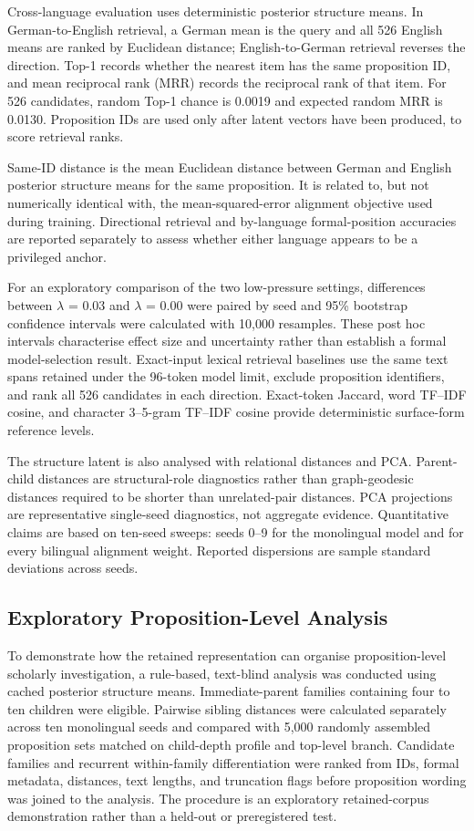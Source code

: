 \documentclass[webpdf,modern,medium,namedate]{oup-authoring-template}
\begin{document}
Cross-language evaluation uses deterministic posterior structure means. In German-to-English retrieval, a German mean is the query and all 526 English means are ranked by Euclidean distance; English-to-German retrieval reverses the direction. Top-1 records whether the nearest item has the same proposition ID, and mean reciprocal rank (MRR) records the reciprocal rank of that item. For 526 candidates, random Top-1 chance is 0.0019 and expected random MRR is 0.0130. Proposition IDs are used only after latent vectors have been produced, to score retrieval ranks.

Same-ID distance is the mean Euclidean distance between German and English posterior structure means for the same proposition. It is related to, but not numerically identical with, the mean-squared-error alignment objective used during training. Directional retrieval and by-language formal-position accuracies are reported separately to assess whether either language appears to be a privileged anchor.

For an exploratory comparison of the two low-pressure settings, differences between $\lambda$ = 0.03 and $\lambda$ = 0.00 were paired by seed and 95\% bootstrap confidence intervals were calculated with 10,000 resamples. These post hoc intervals characterise effect size and uncertainty rather than establish a formal model-selection result. Exact-input lexical retrieval baselines use the same text spans retained under the 96-token model limit, exclude proposition identifiers, and rank all 526 candidates in each direction. Exact-token Jaccard, word TF--IDF cosine, and character 3--5-gram TF--IDF cosine provide deterministic surface-form reference levels.

The structure latent is also analysed with relational distances and PCA. Parent-child distances are structural-role diagnostics rather than graph-geodesic distances required to be shorter than unrelated-pair distances. PCA projections are representative single-seed diagnostics, not aggregate evidence. Quantitative claims are based on ten-seed sweeps: seeds 0--9 for the monolingual model and for every bilingual alignment weight. Reported dispersions are sample standard deviations across seeds.

\subsection{Exploratory Proposition-Level Analysis}
To demonstrate how the retained representation can organise proposition-level scholarly investigation, a rule-based, text-blind analysis was conducted using cached posterior structure means. Immediate-parent families containing four to ten children were eligible. Pairwise sibling distances were calculated separately across ten monolingual seeds and compared with 5,000 randomly assembled proposition sets matched on child-depth profile and top-level branch. Candidate families and recurrent within-family differentiation were ranked from IDs, formal metadata, distances, text lengths, and truncation flags before proposition wording was joined to the analysis. The procedure is an exploratory retained-corpus demonstration rather than a held-out or preregistered test.
\end{document}
